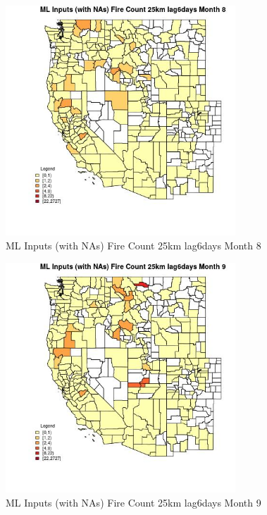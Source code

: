 \begin{figure} 
\centering  
\includegraphics[width=0.77\textwidth]{Code_Outputs/Report_ML_input_PM25_Step4_part_f_de_duplicated_aves_prioritize_24hr_obswNAs_CountyFire_Count_25km_lag6daysmedianMonth8.jpg} 
\caption{\label{fig:Report_ML_input_PM25_Step4_part_f_de_duplicated_aves_prioritize_24hr_obswNAsCountyFire_Count_25km_lag6daysmedianMonth8}ML Inputs (with NAs) Fire Count 25km lag6days Month 8} 
\end{figure} 
 

\begin{figure} 
\centering  
\includegraphics[width=0.77\textwidth]{Code_Outputs/Report_ML_input_PM25_Step4_part_f_de_duplicated_aves_prioritize_24hr_obswNAs_CountyFire_Count_25km_lag6daysmedianMonth9.jpg} 
\caption{\label{fig:Report_ML_input_PM25_Step4_part_f_de_duplicated_aves_prioritize_24hr_obswNAsCountyFire_Count_25km_lag6daysmedianMonth9}ML Inputs (with NAs) Fire Count 25km lag6days Month 9} 
\end{figure} 
 


